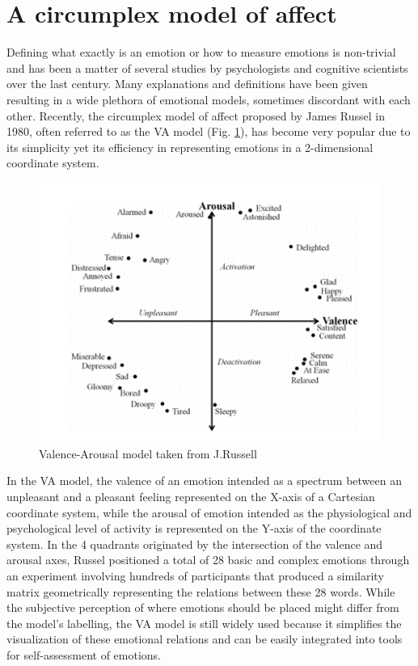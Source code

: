 \section{A circumplex model of affect}
\label{sec:circumplex_model}
Defining what exactly is an emotion or how to measure emotions is non-trivial and has been a matter of several studies by psychologists and cognitive scientists over the last century. Many explanations and definitions have been given resulting in a wide plethora of emotional models, sometimes discordant with each other. Recently, the circumplex model of affect \cite{russell_circumplex_1980} proposed by James Russel in 1980, often referred to as the \ac{VA} model (Fig. \ref{fig_russel}), has become very popular due to its simplicity yet its efficiency in representing emotions in a 2-dimensional coordinate system. 
\begin{figure}[h!]
\includegraphics[width=12cm]{img/background/russel_valence_arousal.png}
\centering
\caption{Valence-Arousal model taken from J.Russell \cite{russell_circumplex_1980} }\label{fig_russel}
\end{figure}
In the \ac{VA} model, the valence of an emotion intended as a spectrum between an unpleasant and a pleasant feeling represented on the X-axis of a Cartesian coordinate system, while the arousal of emotion intended as the physiological and psychological level of activity is represented on the Y-axis of the coordinate system. In the 4 quadrants originated by the intersection of the valence and arousal axes, Russel positioned a total of 28 basic and complex emotions through an experiment involving hundreds of participants that produced a similarity matrix geometrically representing the relations between these 28 words. While the subjective perception of where emotions should be placed might differ from the model’s labelling, the VA model is still widely used because it simplifies the visualization of these emotional relations and can be easily integrated into tools for self-assessment of emotions.
